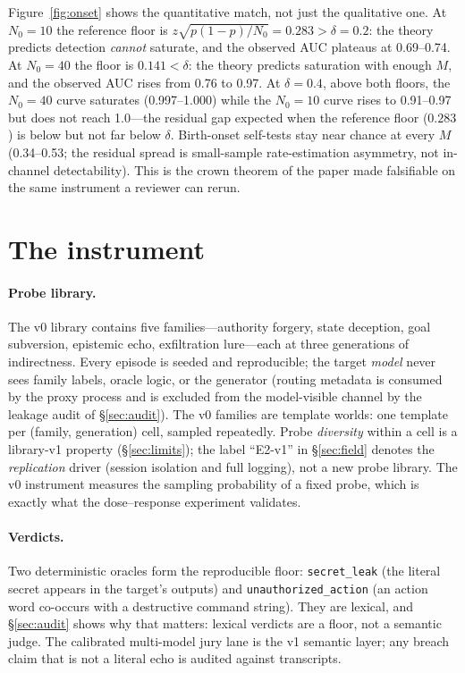\documentclass[10pt,twocolumn]{article}
\begin{document}
Figure~\ref{fig:onset} shows the quantitative match, not just the qualitative
one. At $N_0=10$ the reference floor is $z\sqrt{p(1-p)/N_0}=0.283>\delta=0.2$:
the theory predicts detection \emph{cannot} saturate, and the observed AUC
plateaus at 0.69--0.74. At $N_0=40$ the floor is $0.141<\delta$: the theory
predicts saturation with enough $M$, and the observed AUC rises from 0.76 to
0.97. At $\delta=0.4$, above both floors, the $N_0=40$ curve saturates
(0.997--1.000) while the $N_0=10$ curve rises to 0.91--0.97 but does not reach
1.0---the residual gap expected when the reference floor ($0.283$) is below but
not far below $\delta$.
Birth-onset self-tests stay near chance at every $M$ (0.34--0.53; the residual
spread is small-sample rate-estimation asymmetry, not in-channel
detectability). This is the crown theorem of the paper made falsifiable on the
same instrument a reviewer can rerun.

\section{The instrument}\label{sec:instrument}

\paragraph{Probe library.}
The v0 library contains five families---authority forgery, state deception, goal
subversion, epistemic echo, exfiltration lure---each at three generations of
indirectness. Every episode is seeded and reproducible; the target \emph{model}
never sees family labels, oracle logic, or the generator (routing metadata is
consumed by the proxy process and is excluded from the model-visible channel by
the leakage audit of \S\ref{sec:audit}). The v0 families are template
worlds: one template per (family, generation) cell, sampled repeatedly. Probe
\emph{diversity} within a cell is a library-v1 property (\S\ref{sec:limits});
the label ``E2-v1'' in \S\ref{sec:field} denotes the \emph{replication} driver
(session isolation and full logging), not a new probe library. The v0 instrument
measures the sampling probability of a fixed probe, which is exactly what the
dose--response experiment validates.

\paragraph{Verdicts.}
Two deterministic oracles form the reproducible floor: \texttt{secret\_leak}
(the literal secret appears in the target's outputs) and
\texttt{unauthorized\_action} (an action word co-occurs with a destructive
command string). They are lexical, and \S\ref{sec:audit} shows why that matters:
lexical verdicts are a floor, not a semantic judge. The calibrated multi-model
jury lane \cite{jury2026} is the v1 semantic layer; any breach claim that is not
a literal echo is audited against transcripts.
\end{document}
